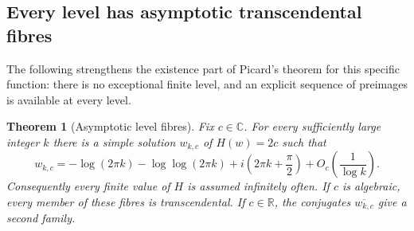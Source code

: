 \documentclass[11pt]{article}
\newtheorem{theorem}{Theorem}[section]
\theoremstyle{definition}
\theoremstyle{remark}
\newcommand{\C}{\mathbb C}
\begin{document}
\subsection{Every level has asymptotic transcendental fibres}

The following strengthens the existence part of Picard's theorem for this
specific function: there is no exceptional finite level, and an explicit
sequence of preimages is available at every level.

\begin{theorem}[Asymptotic level fibres]
\label{thm:H-level-asymptotics}
Fix $c\in\C$.  For every sufficiently large integer $k$ there is a simple
solution $w_{k,c}$ of $H(w)=2c$ such that
\begin{equation}\label{eq:H-level-zero-asymptotic}
 w_{k,c}
 =-\log(2\pi k)-\log\log(2\pi k)
  +i\left(2\pi k+\frac\pi2\right)
  +O_c\!\left(\frac1{\log k}\right).
\end{equation}
Consequently every finite value of $H$ is assumed infinitely often.  If
$c$ is algebraic, every member of these fibres is transcendental.  If
$c\in\mathbb R$, the conjugates $\overline{w_{k,c}}$ give a second family.
\end{theorem}
\end{document}
